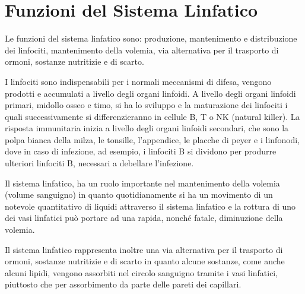 \section{Funzioni del Sistema Linfatico}
Le funzioni del sistema linfatico sono: produzione, mantenimento e distribuzione dei linfociti, 
mantenimento della volemia, via alternativa per il trasporto di ormoni, sostanze nutritizie e di scarto.


I linfociti sono indispensabili per i normali meccanismi di difesa, vengono prodotti e accumulati a livello degli organi linfoidi. 
A livello degli organi linfoidi primari, midollo osseo e timo, si ha lo sviluppo e la maturazione dei linfociti i quali successivamente
si differenzieranno in cellule B, T o NK (natural killer). 
La risposta immunitaria inizia a livello degli organi linfoidi secondari, che sono la polpa bianca della milza,
le tonsille, l'appendice, le placche di peyer e i linfonodi, dove in caso di infezione, ad esempio, i linfociti B
si dividono per produrre ulteriori linfociti B, necessari a debellare l'infezione.

Il sistema linfatico, ha un ruolo importante nel mantenimento della volemia (volume sanguigno) in quanto 
quotidianamente si ha un movimento di un notevole quantitativo di liquidi attraverso il sistema linfatico e la rottura 
di uno dei vasi linfatici può portare ad una rapida, nonché fatale, diminuzione della volemia.

Il sistema linfatico rappresenta inoltre una via alternativa per il trasporto di ormoni, 
sostanze nutritizie e di scarto in quanto alcune sostanze, come anche alcuni lipidi, vengono assorbiti
nel circolo sanguigno tramite i vasi linfatici, piuttosto che per assorbimento da parte delle pareti dei capillari.



